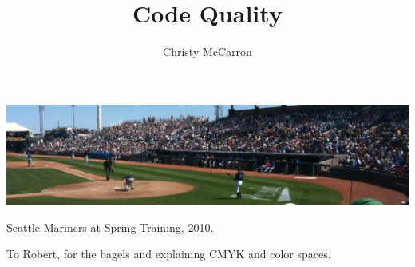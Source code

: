 \documentclass[sigconf, nonacm]{acmart}
\begin{document}
\title{Code Quality}


\author{Christy McCarron}


\begin{abstract}

\end{abstract}


\begin{teaserfigure}
  \includegraphics[width=\textwidth]{images/sampleteaser.pdf}
  \caption{Seattle Mariners at Spring Training, 2010.}
  \label{fig:teaser}
\end{teaserfigure}

\maketitle








\begin{acks}
To Robert, for the bagels and explaining CMYK and color spaces.
\end{acks}




\appendix


\end{document}
